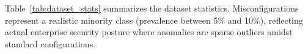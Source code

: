 \begin{table}[t]
\centering
\caption{Dataset statistics across organizations in the open benchmark.}
\label{tab:dataset_stats}

\end{table}

Table~\ref{tab:dataset_stats} summarizes the dataset statistics. Misconfigurations represent a realistic minority class (prevalence between 5\% and 10\%), reflecting actual enterprise security posture where anomalies are sparse outliers amidst standard configurations.

